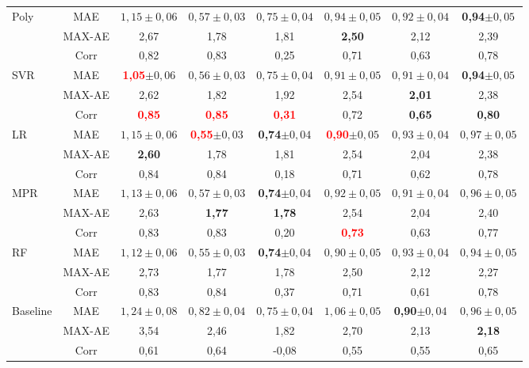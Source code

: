\begin{table}[]
\begin{center}
\begin{tabular}{lc||c|c|c|c|c|c}
			\hline \hline
			\multirow{3}{*}{Poly}
			& MAE & $1,15\pm0,06$ & $0,57\pm0,03$ & $0,75\pm0,04$ & $0,94\pm0,05$ & $0,92\pm0,04$ & \textbf{0,94}$\pm0,05$\\
			& MAX-AE & 2,67 & 1,78 & 1,81 & \textbf{2,50} & 2,12 & 2,39 \\
			& Corr   & 0,82 & 0,83 & 0,25 & 0,71 & 0,63 & 0,78 \\
			\hline
			\multirow{3}{*}{SVR}
			& MAE & \textcolor{red}{\textbf{1,05}}$\pm0,06$ & $0,56\pm0,03$ & $0,75\pm0,04$ & $0,91\pm0,05$ & $0,91\pm0,04$ & \textbf{0,94}$\pm0,05$\\
			& MAX-AE & 2,62 & 1,82 & 1,92 & 2,54 & \textbf{2,01} & 2,38 \\
			& Corr   & \textcolor{red}{\textbf{0,85}} & \textcolor{red}{\textbf{0,85}} & \textcolor{red}{\textbf{0,31}} & 0,72 & \textbf{0,65} & \textbf{0,80} \\
			\hline
			\multirow{3}{*}{LR}
			& MAE & $1,15\pm0,06$ & \textcolor{red}{\textbf{0,55}}$\pm0,03$ & \textbf{0,74}$\pm0,04$ & \textcolor{red}{\textbf{0,90}}$\pm0,05$ & $0,93\pm0,04$ & $0,97\pm0,05$\\
			& MAX-AE & \textbf{2,60} & 1,78 & 1,81 & 2,54 & 2,04 & 2,38 \\
			& Corr   & 0,84 & 0,84 & 0,18 & 0,71 & 0,62 & 0,78 \\
			\hline
			\multirow{3}{*}{MPR}
			& MAE & $1,13\pm0,06$ & $0,57\pm0,03$ & \textbf{0,74}$\pm0,04$ & $0,92\pm0,05$ & $0,91\pm0,04$ & $0,96\pm0,05$\\
			& MAX-AE & 2,63 & \textbf{1,77} & \textbf{1,78} & 2,54 & 2,04 & 2,40 \\
			& Corr   & 0,83 & 0,83 & 0,20 & \textcolor{red}{\textbf{0,73}} & 0,63 & 0,77 \\			
			\hline
			\multirow{3}{*}{RF}
			& MAE & $1,12\pm0,06$ & $0,55\pm0,03$ & \textbf{0,74}$\pm0,04$ & $0,90\pm0,05$ & $0,93\pm0,04$ & $0,94\pm0,05$\\
			& MAX-AE & 2,73 & 1,77 & 1,78 & 2,50 & 2,12 & 2,27 \\
			& Corr   & 0,83 & 0,84 & 0,37 & 0,71 & 0,61 & 0,78 \\
			\hline
			\multirow{3}{*}{Baseline} 
			& MAE & $1,24\pm{0,08}$ & $0,82\pm{0,04}$ & $0,75\pm{0,04}$ & $1,06\pm{0,05}$ & \textbf{0,90}$\pm{0,04}$ & $0,96\pm{0,05}$ \\
			&MAX-AE & 3,54 & 2,46 & 1,82 & 2,70 & 2,13 & \textbf{2,18}\\
			&Corr   & 0,61 & 0,64 &-0,08 & 0,55 & 0,55 & 0,65\\

		\end{tabular}
	\end{center}
	\label{tab:testset}
\end{table}


